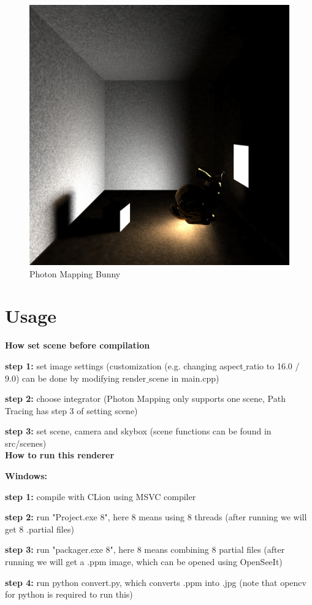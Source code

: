 \documentclass[utf8]{article}
\begin{document}
\begin{figure}[H]
	\centering
	\includegraphics[width=0.5\linewidth]{../_results/photon_mapping_bunny}
	\caption{Photon Mapping Bunny}
	\label{fig:photonmappingbunny}
\end{figure}

\newpage
\section{Usage}

\large \textbf{How set scene before compilation}

\normalsize
\noindent
\textbf{step 1:} set image settings (customization (e.g. changing aspect$\_$ratio to 16.0 / 9.0) can be done by modifying render$\_$scene in main.cpp)

\noindent
\textbf{step 2:} choose integrator (Photon Mapping only supports one scene, Path Tracing has step 3 of setting scene)

\noindent
\textbf{step 3:} set scene, camera and skybox (scene functions can be found in src/scenes) \\

\noindent
\large \textbf{How to run this renderer}

\normalsize
\noindent
\textbf{Windows:}

\noindent
\textbf{step 1:} compile with CLion using MSVC compiler

\noindent
\textbf{step 2:} run "Project.exe 8", here 8 means using 8 threads (after running we will get 8 .partial files)

\noindent
\textbf{step 3:} run "packager.exe 8", here 8 means combining 8 partial files (after running we will get a .ppm image, which can be opened using OpenSeeIt)

\noindent
\textbf{step 4:} run python convert.py, which converts .ppm into .jpg (note that opencv for python is required to run this)
\end{document}
